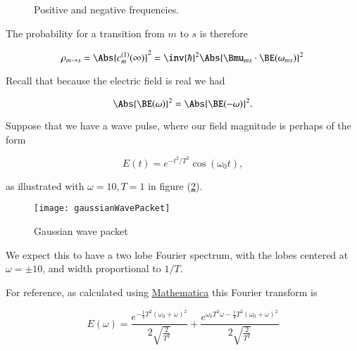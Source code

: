 \begin{figure}[htp]
   \centering
   \def\svgwidth{0.3\columnwidth}
   
   \caption{Positive and negative frequencies.}\label{fig:qmTwoL8fig0FrequenciesAbsorbtionAndEmission}
\end{figure}

The probability for a transition from $m$ to $s$ is therefore

\begin{equation}\label{eqn:qmTwoL8:70}
\rho_{m \rightarrow s} = \Abs{ c_m^{(1)}(\infty) }^2
= \inv{\hbar}^2 \Abs{\Bmu_{ms} \cdot \BE(\omega_{ms})}^2
\end{equation}

Recall that because the electric field is real we had

\begin{equation}\label{eqn:qmTwoL8:90}
\Abs{\BE(\omega)}^2 = \Abs{\BE(-\omega)}^2.
\end{equation}

Suppose that we have a wave pulse, where our field magnitude is perhaps of the form

\begin{equation}\label{eqn:qmTwoL8:110}
E(t) = e^{-t^2/T^2} \cos(\omega_0 t),
\end{equation}

as illustrated with $\omega = 10, T = 1$ in figure (\ref{fig:gaussianWavePacket}).

\begin{figure}[htp]
\centering
\texttt{[image: gaussianWavePacket]}
\caption{Gaussian wave packet}\label{fig:gaussianWavePacket}
\end{figure}

We expect this to have a two lobe Fourier spectrum, with the lobes centered at $\omega = \pm 10$, and width proportional to $1/T$.

For reference, as calculated using \href{https://github.com/peeterjoot/physicsplay/tree/master/notes/phy456/qmTwoL8figures.nb}{Mathematica} this Fourier transform is

\begin{equation}\label{eqn:qmTwoL8:130}
E(\omega) = \frac{e^{-\frac{1}{4} T^2 (\omega_0+\omega )^2}}{2 \sqrt{\frac{2}{T^2}}}+\frac{e^{\omega_0 T^2 \omega -\frac{1}{4} T^2 (\omega_0+\omega )^2}}{2 \sqrt{\frac{2}{T^2}}}
\end{equation}

